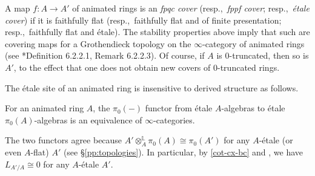 A map $f\colon A\to A'$ of animated rings is an \emph{fpqc cover} (resp.,~\emph{fppf cover}; resp.,~\emph{\'{e}tale cover}) if it is faithfully flat (resp.,~faithfully flat and of finite presentation; resp.,~faithfully flat and \'{e}tale). The stability properties above imply that such are covering maps for a Grothendieck topology on the $\infty$-category of animated rings (see \cite{HTT}*{Definition 6.2.2.1, Remark 6.2.2.3}). %
Of course, if $A$ is $0$-truncated, then so is $A'$, to the effect that one does not obtain new covers of $0$-truncated rings.
\epp



The \'{e}tale site of an animated ring is insensitive to derived structure as follows. %







\bprop \label{rem:no-new-etale}
For an animated ring $A$, the $\pi_0(-)$  functor from \'etale  $A$-algebras to \'etale  $\pi_0(A)$-algebras is an equivalence of $\infty$-categories.
\eprop

\bpf
The two functors agree because $A'\otimes_A^{\mathbb L} \pi_0(A) \cong \pi_0(A')$ for any $A$-\'{e}tale (or even $A$-flat) $A'$ (see \S\ref{pp:topologies}). In particular, by \eqref{cot-cx-bc} and , we have $L_{A'/A}\cong0$ for any $A$-\'{e}tale $A'$.

